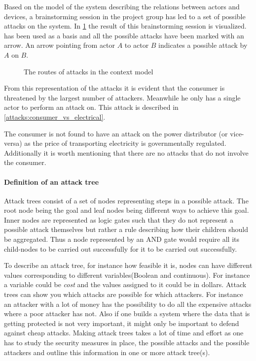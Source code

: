 
Based on the model of the system describing the relations between actors and devices, a brainstorming session in the project group has led to a set of possible attacks on the system.
In \cref{contextual:sm_model_attack} the result of this brainstorming session is visualized.
 has been used as a basis and all the possible attacks have been marked with an arrow.
An arrow pointing from actor $A$ to actor $B$ indicates a possible attack by $A$ on $B$.

\begin{figure}[h]
  \centering
  
  \caption{The routes of attacks in the context model}
  \label{contextual:sm_model_attack}
\end{figure}

From this representation of the attacks it is evident that the consumer is threatened by the largest number of attackers.
Meanwhile he only has a single actor to perform an attack on.
This attack is described in \cref{attacks:consumer_vs_electrical}.

The consumer is not found to have an attack on the power distributor (or vice-versa) as the price of transporting electricity is governmentally regulated.
Additionally it is worth mentioning that there are no attacks that do not involve the consumer.

\paragraph{Definition of an attack tree}
Attack trees consist of a set of nodes representing steps in a possible attack.
The root node being the goal and leaf nodes being different ways to achieve this goal.
Inner nodes are represented as logic gates such that they do not represent a possible attack themselves but rather a rule describing how their children should be aggregated.
Thus a node represented by an AND gate would require all its child-nodes to be carried out successfully for it to be carried out successfully.

To describe an attack tree, for instance how feasible it is, nodes can have different values corresponding to different variables(Boolean and continuous).
For instance a variable could be \textit{cost} and the values assigned to it could be in dollars.
Attack trees can show you which attacks are possible for which attackers.
For instance an attacker with a lot of money has the possibility to do all the expensive attacks where a poor attacker has not.
Also if one builds a system where the data that is getting protected is not very important, it might only be important to defend against cheap attacks.
Making attack trees takes a lot of time and effort as one has to study the security measures in place, the possible attacks and the possible attackers and outline this information in one or more attack tree(s).\cite{schneier_attack_trees}
